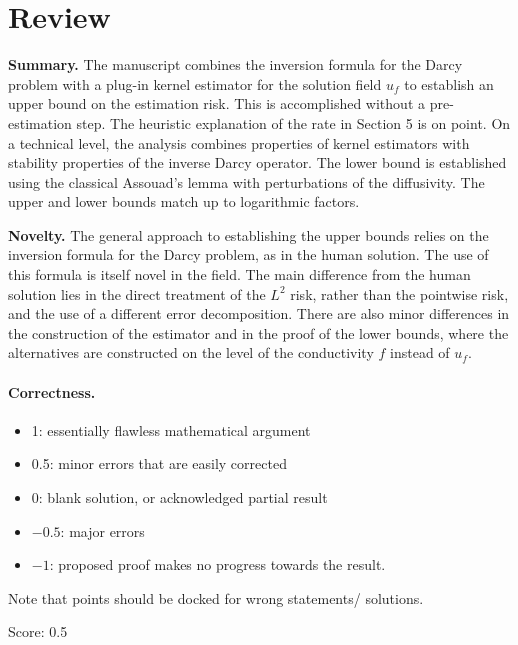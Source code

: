 \documentclass[11pt]{article}
\theoremstyle{definition}
\theoremstyle{remark}
\begin{document}
\maketitle

\section{Review}

\noindent \textbf{Summary.} The manuscript combines the inversion formula for the Darcy problem with a plug-in kernel estimator for the solution field $u_f$ to establish an upper bound on the estimation risk. This is accomplished without a pre-estimation step. The heuristic explanation of the rate in Section 5 is on point. On a technical level, the analysis combines properties of kernel estimators with stability properties of the inverse Darcy operator. The lower bound is established using the classical Assouad's lemma with perturbations of the diffusivity. The upper and lower bounds match up to logarithmic factors.

\noindent \textbf{Novelty.} The general approach to establishing the upper bounds relies on the inversion formula for the Darcy problem, as in the human solution. The use of this formula is itself novel in the field. The main difference from the human solution lies in the direct treatment of the $L^2$ risk, rather than the pointwise risk, and the use of a different error decomposition. There are also minor differences in the construction of the estimator and in the proof of the lower bounds, where the alternatives are constructed on the level of the conductivity $f$ instead of $u_f$.

\paragraph{Correctness.}
\begin{itemize}
	\item  1: essentially flawless mathematical argument
	\item  0.5: minor errors that are easily corrected
	\item  0: blank solution, or acknowledged partial result
	\item  $-0.5$: major errors
	\item  $-1$: proposed proof makes no progress towards the result.
\end{itemize}
Note that points should be docked for wrong statements/ solutions.

\noindent Score: 0.5
\end{document}
